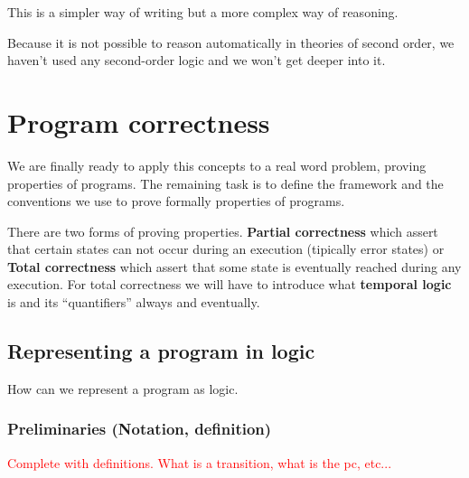 This is a simpler way of writing but a more complex way of reasoning.

Because it is not possible to reason automatically in theories of second order, we haven't used any second-order logic and we won't get deeper into it.




\section{Program correctness}

We are finally ready to apply this concepts to a real word problem, proving properties of programs.
The remaining task is to define the framework and the conventions we use to prove formally properties of programs.

There are two forms of proving properties. \textbf{Partial correctness} which assert that certain states can not occur during an execution (tipically error states) or \textbf{Total correctness} which assert that some state is eventually reached during any execution. For total correctness we will have to introduce what \textbf{temporal logic} is and its ``quantifiers'' always and eventually.




\subsection{Representing a program in logic}

How can we represent a program as logic.

\subsubsection{Preliminaries (Notation, definition)}

\textcolor{red}{Complete with definitions. What is a transition, what is the pc, etc...}



